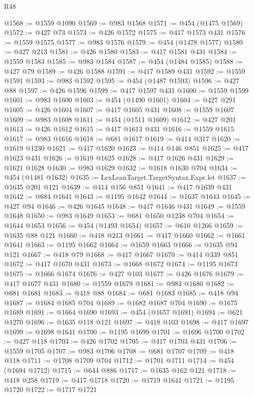 \begin{lexlean}{R48}
\begin{coremodule}
@1568 := @1559 @1090
@1569 := @983 @1568
@1571 := @454 (@1475 @1569)
@1572 := @427 @73
@1573 := @426 @1572
@1575 := @417 @1573 @431
@1576 := @1559 @1575
@1577 := @983 @1576
@1579 := @454 (@1478 @1577)
@1580 := @427 @213
@1581 := @426 @1580
@1583 := @417 @1581 @431
@1584 := @1559 @1583
@1585 := @983 @1584
@1587 := @454 (@1484 @1585)
@1588 := @427 @79
@1589 := @426 @1588
@1591 := @417 @1589 @431
@1592 := @1559 @1591
@1593 := @983 @1592
@1595 := @454 (@1487 @1593)
@1596 := @427 @88
@1597 := @426 @1596
@1599 := @417 @1597 @431
@1600 := @1559 @1599
@1601 := @983 @1600
@1603 := @454 (@1490 @1601)
@1604 := @427 @291
@1605 := @426 @1604
@1607 := @417 @1605 @431
@1608 := @1559 @1607
@1609 := @983 @1608
@1611 := @454 (@1511 @1609)
@1612 := @427 @201
@1613 := @426 @1612
@1615 := @417 @1613 @431
@1616 := @1559 @1615
@1617 := @983 @1616
@1618 := @681 @1617
@1619 := @414 @317
@1620 := @1619 @1230
@1621 := @417 @1620
@1623 := @414 @146 @851
@1625 := @417 @1623 @431
@1626 := @1619 @1625
@1628 := @417 @1626 @431
@1629 := @1621 @1628
@1630 := @983 @1629
@1632 := @1618 @1630 @704
@1634 := @454 (@1481 @1632)
@1635 := LexLeanTarget.TargetSyntax.Expr.let
@1637 := @1635 @201 @121
@1639 := @414 @156 @851
@1641 := @417 @1639 @431
@1642 := @684 @1641
@1643 := @1195 @1642
@1644 := @1637 @1643
@1645 := @427 @94
@1646 := @426 @1645
@1648 := @417 @1646 @431
@1649 := @1559 @1648
@1650 := @983 @1649
@1653 := @681 @1650 @1238 @704
@1654 := @1644 @1653
@1656 := @454 (@1493 @1654)
@1657 := @610 @1266
@1659 := @1635 @88 @121
@1660 := @418 @213
@1661 := @417 @1660
@1662 := @1661 @1641
@1663 := @1195 @1662
@1664 := @1659 @1663
@1666 := @1635 @94 @121
@1667 := @418 @79
@1668 := @417 @1667
@1670 := @414 @339 @851
@1672 := @417 @1670 @431
@1673 := @1668 @1672
@1674 := @1195 @1673
@1675 := @1666 @1674
@1676 := @427 @103
@1677 := @426 @1676
@1679 := @417 @1677 @431
@1680 := @1559 @1679
@1681 := @983 @1680
@1682 := @681 @1681
@1683 := @418 @88
@1684 := @681 @1683
@1685 := @418 @94
@1687 := @1684 @1685 @704
@1689 := @1682 @1687 @704
@1690 := @1675 @1689
@1691 := @1664 @1690
@1693 := @454 (@1657 @1691)
@1694 := @621 @1270
@1696 := @1635 @118 @121
@1697 := @418 @103
@1698 := @417 @1697
@1699 := @1698 @1641
@1700 := @1195 @1699
@1701 := @1696 @1700
@1702 := @427 @118
@1703 := @426 @1702
@1705 := @417 @1703 @431
@1706 := @1559 @1705
@1707 := @983 @1706
@1708 := @681 @1707
@1709 := @418 @118
@1711 := @1708 @1709 @704
@1712 := @1701 @1711
@1714 := @454 (@1694 @1712)
@1715 := @644 @886
@1717 := @1635 @162 @121
@1718 := @418 @258
@1719 := @417 @1718
@1720 := @1719 @1641
@1721 := @1195 @1720
@1722 := @1717 @1721

\end{coremodule}
\end{lexlean}
